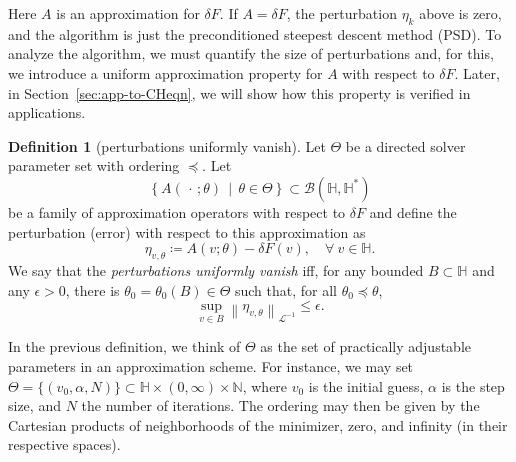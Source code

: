 \documentclass{amsart}
\newcommand{\calB}{{\mathcal{B}}}
\newcommand{\LLinv}{{\mathcal{L}^{-1}}}
\newcommand{\norm}[2]{\left\| #1 \right\| _{#2}}
\newcommand{\HH}{\mathbb{H}}
\newcommand{\NN}{\mathbb{N}}
\newcommand{\ins}{{\alpha}} %
\theoremstyle{definition}
\newtheorem{defn}[thm]{Definition}
\begin{document}
Here $A$ is an approximation for $\delta F$. If $A = \delta F$, the perturbation $\eta_k$ above is zero, and the algorithm is just the preconditioned steepest descent method (PSD). To analyze the algorithm, we must quantify the size of perturbations and, for this, we introduce a uniform approximation property for $A$ with respect to $\delta F$. Later, in Section~\ref{sec:app-to-CHeqn}, we will show how this property is verified in applications.

	\begin{defn}[perturbations uniformly vanish]
	\label{def:unif-vanish}
Let $\Theta$ be a directed solver parameter set with ordering $\preceq$. Let 
	\[
\left\{ A(\, \cdot \, ; \theta) \, \middle| \, \theta \in \Theta \right\} \subset \calB(\HH,\HH^*)
	\]
be a family of approximation operators with respect to $\delta F$ and define the perturbation (error) with respect to this approximation as
	\begin{equation}
	\label{def:perturbation}
\eta_{v,\theta} \coloneqq  A(v;\theta) - \delta F(v) , \quad \forall \ v\in \HH.
	\end{equation}
We say that the \emph{perturbations uniformly vanish} iff, for any bounded $B\subset \HH$ and any $\epsilon > 0$, there is $\theta_0 = \theta_0(B) \in \Theta$ such that, for all $\theta_0 \preceq \theta$,
	\begin{equation*}
\sup_{v \in B} \norm{\eta_{v,\theta}}{\LLinv} \le \epsilon.
	\end{equation*}
	\end{defn}

In the previous definition, we think of $\Theta$ as the set of practically adjustable parameters in an approximation scheme. For instance, we may set $\Theta = \{(v_0, \ins, N)\} \subset \HH \times (0,\infty) \times \NN$, where $v_0$ is the initial guess, $\ins$ is the step size, and $N$ the number of iterations. The ordering may then be given by the Cartesian products of neighborhoods of the minimizer, zero, and infinity (in their respective spaces).
\end{document}
